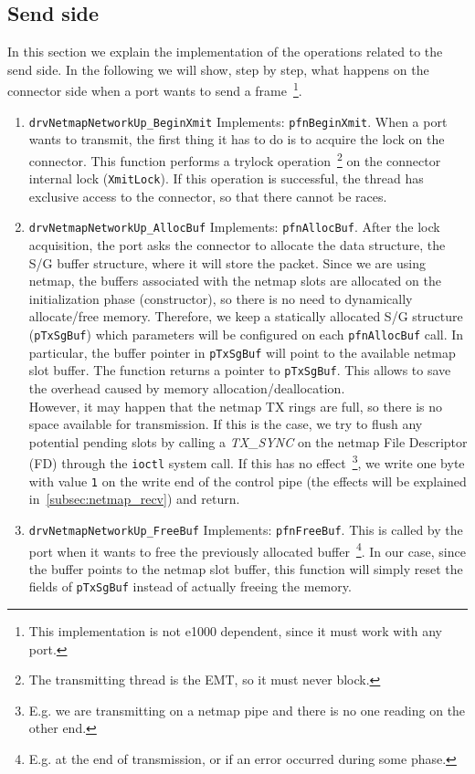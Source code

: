\documentclass[a4paper, 12pt, titlepage]{report}
\begin{document}
\subsection{Send side} \label{subsec:netmap_send}
In this section we explain the implementation of the operations related to the send side. In the following we will show, step by step, what happens on the connector side when a port wants to send a frame~\footnote{This implementation is not e1000 dependent, since it must work with any port.}.
\begin{enumerate}
\item \texttt{drvNetmapNetworkUp\_BeginXmit} Implements: \texttt{pfnBeginXmit}. When a port wants to transmit, the first thing it has to do is to acquire the lock on the connector. This function performs a trylock operation~\footnote{The transmitting thread is the EMT, so it must never block.} on the connector internal lock (\texttt{XmitLock}). If this operation is successful, the thread has exclusive access to the connector, so that there cannot be races.
\item \texttt{drvNetmapNetworkUp\_AllocBuf} Implements: \texttt{pfnAllocBuf}. After the lock acquisition, the port asks the connector to allocate the data structure, the S/G buffer structure, where it will store the packet. Since we are using netmap, the buffers associated with the netmap slots are allocated on the initialization phase (constructor), so there is no need to dynamically allocate/free memory. Therefore, we keep a statically allocated S/G structure (\texttt{pTxSgBuf}) which parameters will be configured on each \texttt{pfnAllocBuf} call. In particular, the buffer pointer in \texttt{pTxSgBuf} will point to the available netmap slot buffer. The function returns a pointer to \texttt{pTxSgBuf}. This allows to save the overhead caused by memory allocation/deallocation.
\\
However, it may happen that the netmap TX rings are full, so there is no space available for transmission. If this is the case, we try to flush  any potential pending slots by calling a \textit{TX\_SYNC} on the netmap File Descriptor (FD) through the \texttt{ioctl} system call. If this has no effect~\footnote{E.g. we are transmitting on a netmap pipe and there is no one reading on the other end.}, we %
write one byte with value \texttt{1} on the write end of the control pipe (the effects will be explained in~\ref{subsec:netmap_recv}) and return.
\item \texttt{drvNetmapNetworkUp\_FreeBuf} Implements: \texttt{pfnFreeBuf}. This is called by the port when it wants to free the previously allocated buffer~\footnote{E.g. at the end of transmission, or if an error occurred during some phase.}. In our case, since the buffer points to the netmap slot buffer, this function will simply reset the fields of \texttt{pTxSgBuf} instead of actually freeing the memory.

\end{enumerate}
\end{document}
